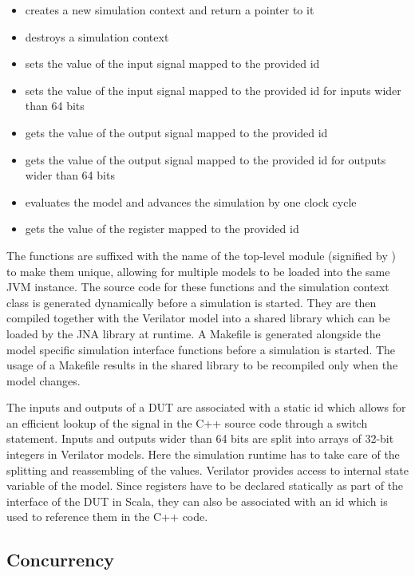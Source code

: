 \begin{itemize}
  \item {} creates a new simulation context and return a pointer to it
  \item {} destroys a simulation context
  \item {} sets the value of the input signal mapped to the provided id
  \item {} sets the value of the input signal mapped to the provided id for inputs wider than 64 bits
  \item {} gets the value of the output signal mapped to the provided id
  \item {} gets the value of the output signal mapped to the provided id for outputs wider than 64 bits
  \item {} evaluates the model and advances the simulation by one clock cycle
  \item {} gets the value of the register mapped to the provided id
\end{itemize}

The functions are suffixed with the name of the top-level module (signified by ) to make them unique,
allowing for multiple models to be loaded into the same JVM instance. The source code for these functions and the simulation context class is generated dynamically before a simulation is started. They are then
compiled together with the Verilator model into a shared library which can be loaded by the JNA library at runtime. A
Makefile is generated alongside the model specific simulation interface functions before a
simulation is started. The usage of a Makefile results in the shared library to be recompiled only when the model changes.

The inputs and outputs of a DUT are associated with a static id which allows for an efficient lookup of the signal in the C++ source code through a switch statement. Inputs and outputs wider than 64 bits are split into arrays of 32-bit integers in Verilator models. Here the simulation runtime has to take care of the splitting and reassembling of the values. Verilator provides access to internal state variable of the model. Since registers have to be declared statically as part of the interface of the DUT in Scala, they can also be associated with an id which is used to reference them in the C++ code.


\subsection{Concurrency} %

